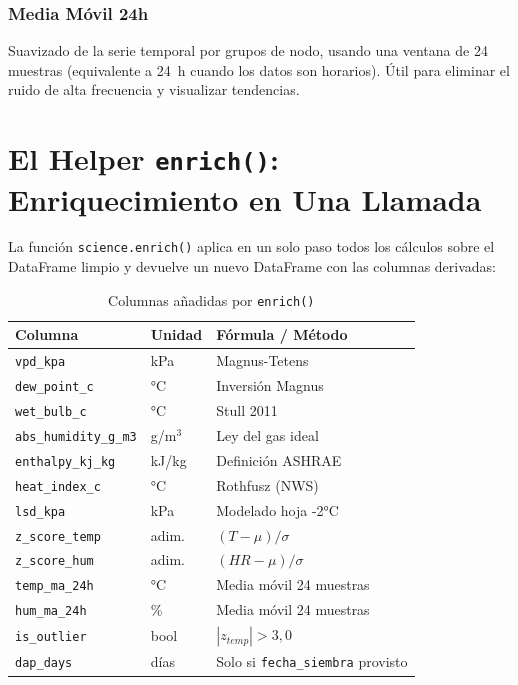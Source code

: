 \subsubsection{Media Móvil 24h}

Suavizado de la serie temporal por grupos de nodo, usando una ventana de
24 muestras (equivalente a 24~h cuando los datos son horarios). Útil para
eliminar el ruido de alta frecuencia y visualizar tendencias.

\section{El Helper \texttt{enrich()}: Enriquecimiento en Una Llamada}

La función \texttt{science.enrich()} aplica en un solo paso todos los cálculos
sobre el DataFrame limpio y devuelve un nuevo DataFrame con las columnas derivadas:

\begin{table}[H]
    \centering
    \caption{Columnas añadidas por \texttt{enrich()}}
    \begin{tabular}{lll}
        \toprule
        \textbf{Columna}         & \textbf{Unidad} & \textbf{Fórmula / Método} \\
        \midrule
        \texttt{vpd\_kpa}        & kPa             & Magnus-Tetens \\
        \texttt{dew\_point\_c}   & °C              & Inversión Magnus \\
        \texttt{wet\_bulb\_c}    & °C              & Stull 2011 \\
        \texttt{abs\_humidity\_g\_m3} & g/m$^3$   & Ley del gas ideal \\
        \texttt{enthalpy\_kj\_kg}& kJ/kg           & Definición ASHRAE \\
        \texttt{heat\_index\_c}  & °C              & Rothfusz (NWS) \\
        \texttt{lsd\_kpa}        & kPa             & Modelado hoja -2°C \\
        \texttt{z\_score\_temp}  & adim.           & $(T - \mu)/\sigma$ \\
        \texttt{z\_score\_hum}   & adim.           & $(HR - \mu)/\sigma$ \\
        \texttt{temp\_ma\_24h}   & °C              & Media móvil 24 muestras \\
        \texttt{hum\_ma\_24h}    & \%              & Media móvil 24 muestras \\
        \texttt{is\_outlier}     & bool            & $|z_{temp}| > 3{,}0$ \\
        \texttt{dap\_days}       & días            & Solo si \texttt{fecha\_siembra} provisto \\
        \bottomrule
    \end{tabular}
    \label{tab:enrich_columns}
\end{table}

